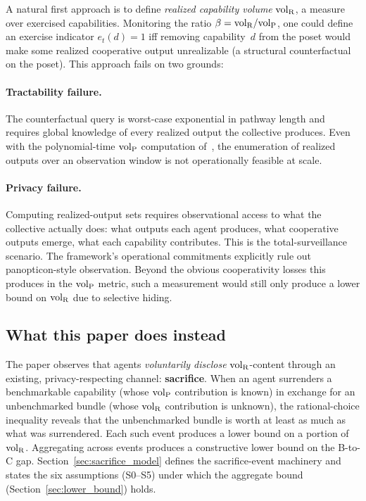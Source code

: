 A natural first approach is to define \emph{realized capability volume}
${\operatorname{vol}_{\mathrm{R}}}$, a measure over exercised capabilities. Monitoring the ratio $\beta =
{\operatorname{vol}_{\mathrm{R}}} / {\operatorname{vol}_{\mathrm{P}}}$, one could define an exercise indicator $e_t(d) = 1$ iff
removing capability~$d$ from the poset would make some realized cooperative
output unrealizable (a structural counterfactual on the poset).  This approach
fails on two grounds:

\paragraph{Tractability failure.}
The counterfactual query is worst-case exponential in pathway length and
requires global knowledge of every realized output the collective produces.
Even with the polynomial-time ${\operatorname{vol}_{\mathrm{P}}}$ computation
of~\citep[Proposition~2]{lasser2026poset}, the enumeration of realized outputs
over an observation window is not operationally feasible at scale.

\paragraph{Privacy failure.}
Computing realized-output sets requires observational access to what the
collective actually does: what outputs each agent produces, what cooperative
outputs emerge, what each capability contributes. This is the
total-surveillance scenario. The framework's operational commitments explicitly
rule out panopticon-style observation. Beyond the obvious cooperativity losses
this produces in the ${\operatorname{vol}_{\mathrm{P}}}$ metric, such a measurement would still only produce
a lower bound on ${\operatorname{vol}_{\mathrm{R}}}$ due to selective hiding.

\subsection{What this paper does instead}

The paper observes that agents \emph{voluntarily disclose}
${\operatorname{vol}_{\mathrm{R}}}$-content through an existing, privacy-respecting channel:
\textbf{sacrifice}.  When an agent surrenders a benchmarkable
capability (whose ${\operatorname{vol}_{\mathrm{P}}}$ contribution is known) in exchange for
an unbenchmarked bundle (whose ${\operatorname{vol}_{\mathrm{R}}}$ contribution is unknown),
the rational-choice inequality reveals that the unbenchmarked
bundle is worth at least as much as what was surrendered.  Each
such event produces a lower bound on a portion of ${\operatorname{vol}_{\mathrm{R}}}$.
Aggregating across events produces a constructive lower bound on
the B-to-C gap.  Section~\ref{sec:sacrifice_model} defines the
sacrifice-event machinery and states the six assumptions
(S0--S5) under which the aggregate bound
(Section~\ref{sec:lower_bound}) holds.

